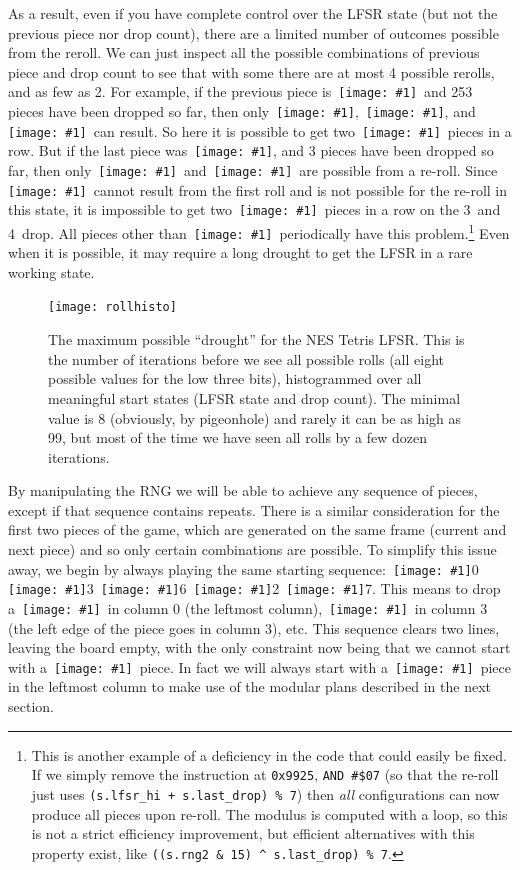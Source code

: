 \documentclass[twocolumn]{article}
\newcommand\tetrispiece[1]{\,\texttt{[image: \#1]}\hspace{0.1em}}
\newcommand\ihoriz{\tetrispiece{i_horiz}}
\newcommand\squarepiece{\tetrispiece{square}}
\newcommand\tup{\tetrispiece{t_up}}
\newcommand\jleft{\tetrispiece{j_left}}
\newcommand\jdown{\tetrispiece{j_down}}
\newcommand\jright{\tetrispiece{j_right}}
\newcommand\zhoriz{\tetrispiece{z_horiz}}
\newcommand\shoriz{\tetrispiece{s_horiz}}
\newcommand\svert{\tetrispiece{s_vert}}
\newcommand\lup{\tetrispiece{l_up}}
\newcommand\lleft{\tetrispiece{l_left}}
\newcommand\lright{\tetrispiece{l_right}}
\begin{document}
As a result, even if you have complete control over the LFSR state
(but not the previous piece nor drop count), there are a limited
number of outcomes possible from the reroll. We can just inspect all
the possible combinations of previous piece and drop count to see that
with some there are at most 4 possible rerolls, and as few as 2. For
example, if the previous piece is \shoriz\ and 253 pieces have been
dropped so far, then only \tup, \shoriz, and \jdown\ can result. So
here it is possible to get two \shoriz\ pieces in a row. But if the
last piece was \ihoriz, and 3 pieces have been dropped so far, then
only \zhoriz\ and \lup\ are possible from a re-roll. Since
\ihoriz\ cannot result from the first roll and is not possible for the
re-roll in this state, it is impossible to get two \ihoriz\ pieces in
a row on the 3\rd\ and 4\th\ drop. All pieces other than
\squarepiece\ periodically have this problem.\!\footnote{This is
  another example of a deficiency in the code that could easily be
  fixed. If we simply remove the instruction at {\tt 0x9925},
  \verb+AND #$07+ (so that the re-roll just uses
  \verb|(s.lfsr_hi + s.last_drop) % 7|) then {\it all} configurations
  can now produce all pieces upon re-roll. The modulus is computed
  with a loop, so this is not a strict efficiency improvement, but
  efficient alternatives with this property exist,
  like \verb|((s.rng2 & 15) ^ s.last_drop) % 7|.
} Even when it is possible, it may
require a long drought to get the LFSR in a rare working state.

\begin{figure}[ht]
  \centering
  \texttt{[image: rollhisto]}
  \caption {
    The maximum possible ``drought'' for the NES Tetris LFSR. This is
    the number of iterations before we see all possible rolls (all
    eight possible values for the low three bits), histogrammed
    over all meaningful start states (LFSR state and drop count).
    The minimal value is 8 (obviously, by pigeonhole) and rarely
    it can be as high as 99, but most of the time we have seen
    all rolls by a few dozen iterations.
    } \label{fig:rollhisto}
\end{figure}

By manipulating the RNG we will be able to achieve any sequence of
pieces, except if that sequence contains repeats. There is a similar
consideration for the first two pieces of the game, which are
generated on the same frame (current and next piece) and so only
certain combinations are possible. To simplify this issue away, we
begin by always playing the same starting sequence: \squarepiece 0
\lleft 3 \jright 6 \lright 2 \jleft 7. This means to drop a
\squarepiece\ in column 0 (the leftmost column), \lleft\ in column 3
(the left edge of the piece goes in column 3), etc. This sequence
clears two lines, leaving the board empty, with the only constraint
now being that we cannot start with a \jleft\ piece. In fact we will
always start with a \svert\ piece in the leftmost column to make
use of the modular plans described in the next section.
\end{document}
